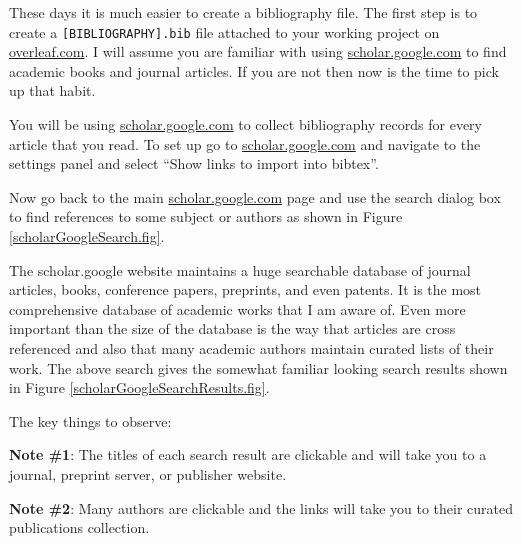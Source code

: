 These days it is much easier to create a bibliography file. The first step is to create a \texttt{[BIBLIOGRAPHY].bib} file attached to your working project on \href{https://overleaf.com}{overleaf.com}. I will assume you are familiar with using \href{https://scholar.google.com}{scholar.google.com} to find academic books and journal articles. If you are not then now is the time to pick up that habit. 

You will be using \href{https://scholar.google.com}{scholar.google.com}  to collect bibliography records for every article that you read. To set up go to \href{https://scholar.google.com}{scholar.google.com}  and navigate to the settings panel and select ``Show links to import into bibtex''.


Now go back to the main \href{https://scholar.google.com}{scholar.google.com} page and use the search dialog box to find references to some subject or authors as shown in Figure \ref{scholarGoogleSearch.fig}.


The scholar.google website maintains a huge searchable database of journal articles, books, conference papers, preprints, and even patents. It is the most comprehensive database of academic works that I am aware of. Even more important than the size of the database is the way that articles are cross referenced and also that many academic authors maintain curated lists of their work. The above search gives the  somewhat familiar looking search results shown in Figure \ref{scholarGoogleSearchResults.fig}.


The key things to observe:

{\bf Note \#1}: The titles of each search result are clickable and will take you to a journal, preprint server, or publisher website. 

{\bf Note \#2}: Many authors are clickable and the links will take you to their curated publications collection.

